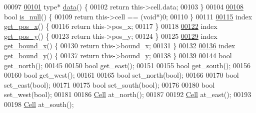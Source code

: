 \begin{DoxyCode}
00097 
\hyperlink{classmaze_1_1Cell_ae4932173d3ff8937edd5915600a43226}{00101}         type* \hyperlink{classmaze_1_1Cell_ae4932173d3ff8937edd5915600a43226}{data}() \{
00102             \textcolor{keywordflow}{return} this->cell.data;
00103         \}
00104 
\hyperlink{classmaze_1_1Cell_ad3f0f0bc988195f1b6e21700bb973598}{00108}         \textcolor{keywordtype}{bool} \hyperlink{classmaze_1_1Cell_ad3f0f0bc988195f1b6e21700bb973598}{is\_null}() \{
00109             \textcolor{keywordflow}{return} this->cell == (\textcolor{keywordtype}{void}*)0;
00110         \}
00111 
\hyperlink{classmaze_1_1Cell_a6893b4512b070791eed9d4b122b89c5a}{00115}         index \hyperlink{classmaze_1_1Cell_a6893b4512b070791eed9d4b122b89c5a}{get\_pos\_x}() \{
00116             \textcolor{keywordflow}{return} this->pos\_x;
00117         \}
00118 
\hyperlink{classmaze_1_1Cell_ac1e9b7aa026f3491f806576ac8ac2c0d}{00122}         index \hyperlink{classmaze_1_1Cell_ac1e9b7aa026f3491f806576ac8ac2c0d}{get\_pos\_y}() \{
00123             \textcolor{keywordflow}{return} this->pos\_y;
00124         \}
00125 
\hyperlink{classmaze_1_1Cell_ab9fa33c182f42fe351c5f6ccf6dde58f}{00129}         index \hyperlink{classmaze_1_1Cell_ab9fa33c182f42fe351c5f6ccf6dde58f}{get\_bound\_x}() \{
00130             \textcolor{keywordflow}{return} this->bound\_x;
00131         \}
00132 
\hyperlink{classmaze_1_1Cell_a7a00ea115675a8ff05823eb42cffa9f2}{00136}         index \hyperlink{classmaze_1_1Cell_a7a00ea115675a8ff05823eb42cffa9f2}{get\_bound\_y}() \{
00137             \textcolor{keywordflow}{return} this->bound\_y;
00138         \}
00139 
00144         \textcolor{keywordtype}{bool} get\_north();
00145 
00150         \textcolor{keywordtype}{bool} get\_east();
00151 
00155         \textcolor{keywordtype}{bool} get\_south();
00156 
00160         \textcolor{keywordtype}{bool} get\_west();
00161 
00165         \textcolor{keywordtype}{bool} set\_north(\textcolor{keywordtype}{bool});
00166 
00170         \textcolor{keywordtype}{bool} set\_east(\textcolor{keywordtype}{bool});
00171 
00175         \textcolor{keywordtype}{bool} set\_south(\textcolor{keywordtype}{bool});
00176 
00180         \textcolor{keywordtype}{bool} set\_west(\textcolor{keywordtype}{bool});
00181 
00186         \hyperlink{classmaze_1_1Cell}{Cell} at\_north();
00187 
00192         \hyperlink{classmaze_1_1Cell}{Cell} at\_east();
00193 
00198         \hyperlink{classmaze_1_1Cell}{Cell} at\_south();

\end{DoxyCode}
